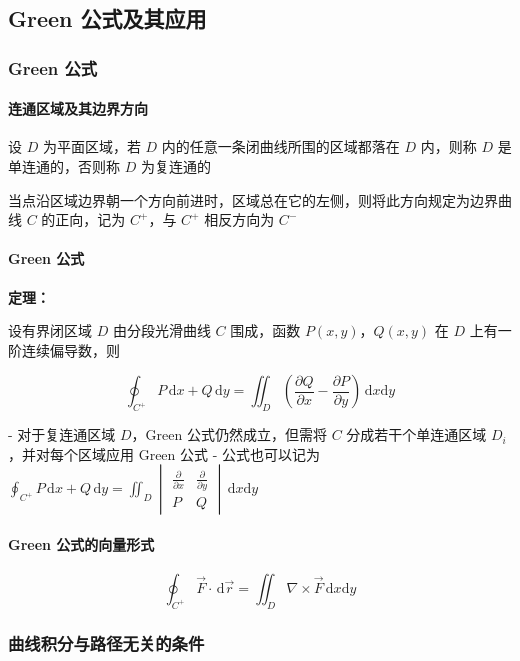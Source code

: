 \documentclass[lang = zh , final , oneside , openany , titlepage , zihao = -4 , linespread = 1.3 , baselineskip = false , cjk-font = windows , text-font = newtx , math-font = newtx]{sjtureport}
\begin{document}
\subsection{Green 公式及其应用}

\subsubsection{Green 公式}

\paragraph{连通区域及其边界方向}

设 \(D\) 为平面区域，若 \(D\) 内的任意一条闭曲线所围的区域都落在 \(D\) 内，则称 \(D\) 是单连通的，否则称 \(D\) 为复连通的

当点沿区域边界朝一个方向前进时，区域总在它的左侧，则将此方向规定为边界曲线 \(C\) 的正向，记为 \(C^+\)，与 \(C^+\) 相反方向为 \(C^−\)

\paragraph{Green 公式}

\textbf{定理：}

设有界闭区域 \(D\) 由分段光滑曲线 \(C\) 围成，函数 \(P(x, y)\)，\(Q(x, y)\) 在 \(D\) 上有一阶连续偏导数，则

\[
\oint_{C^+} P\,\mathrm{d}x + Q\,\mathrm{d}y = \iint_D \left(\frac{\partial Q}{\partial x} - \frac{\partial P}{\partial y}\right)\,\mathrm{d}x\mathrm{d}y
\]

- 对于复连通区域 \(D\)，Green 公式仍然成立，但需将 \(C\) 分成若干个单连通区域 \(D_i\)，并对每个区域应用 Green 公式
- 公式也可以记为 \(\oint_{C^+} P\,\mathrm{d}x + Q\,\mathrm{d}y = \iint_D \begin{vmatrix}\frac{\partial}{\partial x}&\frac{\partial}{\partial y}\\ P&Q\end{vmatrix}\,\mathrm{d}x\mathrm{d}y\)

\paragraph{Green 公式的向量形式}

\[
\oint_{C^+} \vec{F}\cdot\,\mathrm{d}\vec{r} = \iint_D \nabla\times\vec{F}\,\mathrm{d}x\mathrm{d}y
\]

\subsubsection{曲线积分与路径无关的条件}
\end{document}
